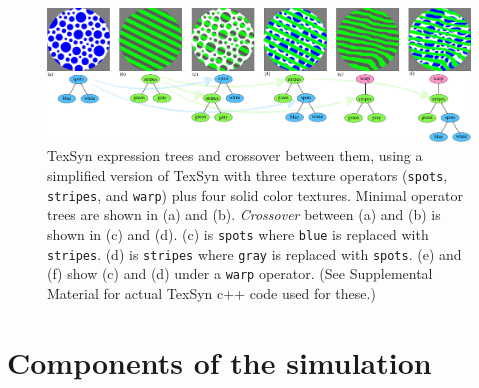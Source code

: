 \documentclass[sigconf]{acmart}
\begin{document}

\begin{figure}
    \includegraphics[width=\textwidth]{images/texsyn_overview.pdf}
    \caption{TexSyn expression trees and crossover between them, using a simplified version of TexSyn with three texture operators (\texttt{spots}, \texttt{stripes}, and \texttt{warp}) plus four solid color textures. Minimal operator trees are shown in (a) and (b). \textit{Crossover} between (a) and (b) is shown in (c) and (d). (c) is \texttt{spots} where \texttt{blue} is replaced with \texttt{stripes}. (d) is \texttt{stripes} where \texttt{gray} is replaced with \texttt{spots}. (e) and (f) show (c) and (d) under a \texttt{warp} operator. (See Supplemental Material for actual TexSyn c++ code used for these.)}
    \label{fig:TexSyn_overview}
\end{figure}



\section{Components of the simulation}
\end{document}
